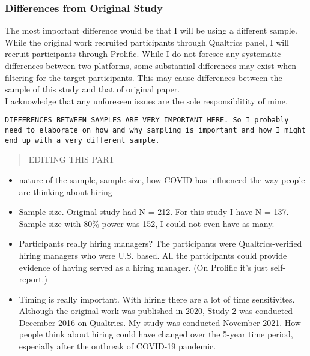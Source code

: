 \documentclass[]{article}
\begin{document}
\hypertarget{differences-from-original-study}{%
\subsubsection{Differences from Original
Study}\label{differences-from-original-study}}

The most important difference would be that I will be using a different
sample. While the original work recruited participants through Qualtrics
panel, I will recruit participants through Prolific. While I do not
foresee any systematic differences between two platforms, some
substantial differences may exist when filtering for the target
participants. This may cause differences between the sample of this
study and that of original paper.\\
I acknowledge that any unforeseen issues are the sole responsiblitity of
mine.\\

\begin{verbatim}
DIFFERENCES BETWEEN SAMPLES ARE VERY IMPORTANT HERE. So I probably need to elaborate on how and why sampling is important and how I might end up with a very different sample.
\end{verbatim}

\begin{quote}
EDITING THIS PART
\end{quote}

\begin{itemize}
\item
  nature of the sample, sample size, how COVID has influenced the way
  people are thinking about hiring
\item
  Sample size. Original study had N = 212. For this study I have N =
  137. Sample size with 80\% power was 152, I could not even have as
  many.
\item
  Participants really hiring managers? The participants were
  Qualtrics-verified hiring managers who were U.S. based. All the
  participants could provide evidence of having served as a hiring
  manager. (On Prolific it's just self-report.)
\item
  Timing is really important. With hiring there are a lot of time
  sensitivites. Although the original work was published in 2020, Study
  2 was conducted December 2016 on Qualtrics. My study was conducted
  November 2021. How people think about hiring could have changed over
  the 5-year time period, especially after the outbreak of COVID-19
  pandemic.
\end{itemize}
\end{document}
